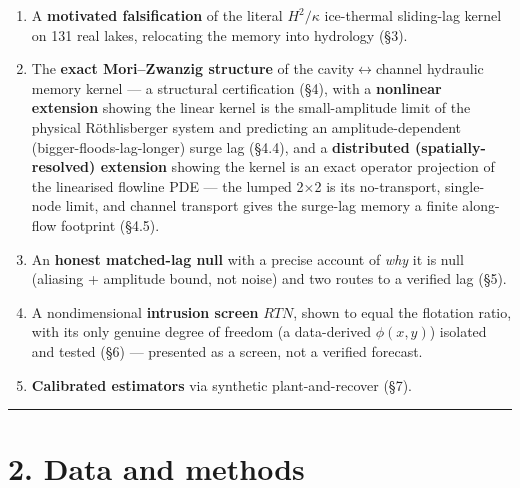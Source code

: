 \documentclass[11pt]{article}
\begin{document}
\begin{enumerate}
\item A \textbf{motivated falsification} of the literal $H^{2}/\kappa $ ice-thermal sliding-lag kernel on 131 real lakes, relocating the memory into hydrology (§3).
\item The \textbf{exact Mori–Zwanzig structure} of the cavity\ensuremath{\leftrightarrow}channel hydraulic memory kernel — a structural certification (§4), with a \textbf{nonlinear extension} showing the linear kernel is the small-amplitude limit of the physical Röthlisberger system and predicting an amplitude-dependent (bigger-floods-lag-longer) surge lag (§4.4), and a \textbf{distributed (spatially-resolved) extension} showing the kernel is an exact operator projection of the linearised flowline PDE — the lumped 2\ensuremath{\times}2 is its no-transport, single-node limit, and channel transport gives the surge-lag memory a finite along-flow footprint (§4.5).
\item An \textbf{honest matched-lag null} with a precise account of \emph{why} it is null (aliasing + amplitude bound, not noise) and two routes to a verified lag (§5).
\item A nondimensional \textbf{intrusion screen} $RTN$, shown to equal the flotation ratio, with its only genuine degree of freedom (a data-derived $\phi (x,y)$) isolated and tested (§6) — presented as a screen, not a verified forecast.
\item \textbf{Calibrated estimators} via synthetic plant-and-recover (§7).
\end{enumerate}


\medskip\hrule\medskip


\section*{2. Data and methods}
\end{document}
